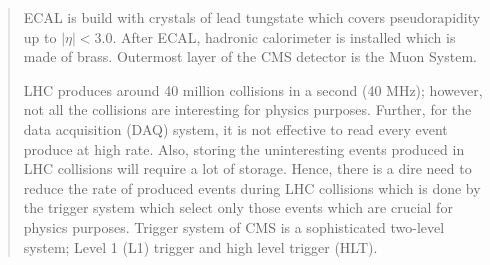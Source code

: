 \begin{abstract}
ECAL is build with crystals of lead tungstate which covers pseudorapidity up to $|\eta| < 3.0$. After ECAL, hadronic calorimeter is installed which is made of brass. Outermost layer of the CMS detector is the Muon System.
\par LHC produces around 40 million collisions in a second (40 MHz); however, not all the collisions are interesting for physics purposes. Further, for the data acquisition (DAQ) system, it is not effective to read every event produce at high rate.
Also, storing the uninteresting events produced in LHC collisions will require a lot of storage.
Hence, there is a dire need to reduce the rate of produced events during LHC collisions which is done by the trigger system which select only those events which are crucial for physics purposes.
Trigger system of CMS is a sophisticated two-level system; Level 1 (L1) trigger and high level trigger (HLT).

\end{abstract}
